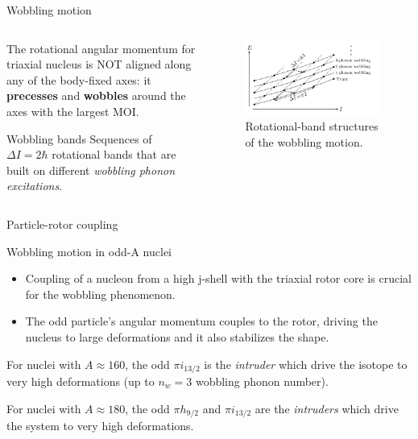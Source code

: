 \documentclass{beamer}
\begin{document}
\begin{frame}{Wobbling motion}
  \begin{columns}
    \begin{column}{0.50\textwidth}
      The rotational angular momentum for triaxial nucleus is NOT aligned along any of the body-fixed axes: it \textbf{precesses} and \textbf{wobbles} around the axes with the largest MOI. 
  \begin{block}{Wobbling bands}
  Sequences of $\Delta I=2\hbar$ rotational bands that are built on different \textit{wobbling phonon excitations}.
  \end{block}
    \end{column}
    \begin{column}{0.50\textwidth}  %
   \begin{figure}
     \centering
     \includegraphics[scale=0.15]{figs/wobblingBands.png}
     \caption{Rotational-band structures of the wobbling motion.}
   \end{figure}
    \end{column}
    \end{columns}
\end{frame}

\begin{frame}{Particle-rotor coupling}
  \begin{block}{Wobbling motion in odd-A nuclei}  
    \begin{itemize}
      \item Coupling of a nucleon from a high j-shell with the triaxial rotor core is crucial for the wobbling phenomenon.
      \item The odd particle’s angular momentum couples to the rotor, driving the nucleus to large deformations and it also stabilizes the shape.
    \end{itemize}
  \end{block}
  For nuclei with $A\approx160$, the odd $\pi i_{13/2}$ is the \emph{intruder} which drive the isotope to very high deformations (up to $n_w=3$ wobbling phonon number).
  
  For nuclei with $A\approx180$, the odd $\pi h_{9/2}$ and $\pi i_{13/2}$ are the \emph{intruders} which drive the system to very high deformations.
\end{frame}
\end{document}
